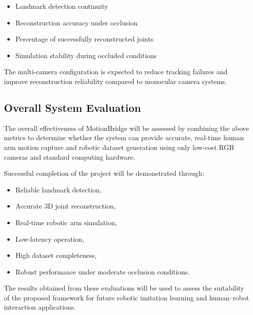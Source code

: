 \begin{itemize}
    \item Landmark detection continuity
    \item Reconstruction accuracy under occlusion
    \item Percentage of successfully reconstructed joints
    \item Simulation stability during occluded conditions
\end{itemize}

The multi-camera configuration is expected to reduce tracking failures and improve reconstruction reliability compared to monocular camera systems.

\subsection{Overall System Evaluation}

The overall effectiveness of MotionBridge will be assessed by combining the above metrics to determine whether the system can provide accurate, real-time human arm motion capture and robotic dataset generation using only low-cost RGB cameras and standard computing hardware.

Successful completion of the project will be demonstrated through:

\begin{itemize}
    \item Reliable landmark detection,
    \item Accurate 3D joint reconstruction,
    \item Real-time robotic arm simulation,
    \item Low-latency operation,
    \item High dataset completeness,
    \item Robust performance under moderate occlusion conditions.
\end{itemize}

The results obtained from these evaluations will be used to assess the suitability of the proposed framework for future robotic imitation learning and human--robot interaction applications.
